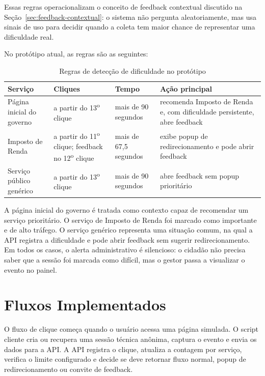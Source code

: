 Essas regras operacionalizam o conceito de feedback contextual discutido na
Seção~\ref{sec:feedback-contextual}: o sistema não pergunta aleatoriamente, mas
usa sinais de uso para decidir quando a coleta tem maior chance de representar
uma dificuldade real.

No protótipo atual, as regras são as seguintes:

\begin{table}[h]
\centering
\caption{Regras de detecção de dificuldade no protótipo}
\label{tab:regras-dificuldade}
\begin{tabular}{p{3.6cm} p{3.0cm} p{2.4cm} p{4.2cm}}
\hline
\textbf{Serviço} & \textbf{Cliques} & \textbf{Tempo} &
\textbf{Ação principal} \\
\hline
Página inicial do governo & a partir do 13\textsuperscript{o} clique &
mais de 90 segundos & recomenda Imposto de Renda e, com dificuldade persistente,
abre feedback \\
Imposto de Renda & a partir do 11\textsuperscript{o} clique; feedback no
12\textsuperscript{o} clique & mais de 67,5 segundos & exibe popup de
redirecionamento e pode abrir feedback \\
Serviço público genérico & a partir do 13\textsuperscript{o} clique &
mais de 90 segundos & abre feedback sem popup
prioritário \\
\hline
\end{tabular}
\end{table}

\clearpage

A página inicial do governo é tratada como contexto capaz de recomendar um
serviço prioritário. O serviço de Imposto de Renda foi marcado como importante e
de alto tráfego. O serviço genérico representa uma situação comum, na qual a API
registra a dificuldade e pode abrir feedback sem sugerir redirecionamento. Em
todos os casos, o alerta administrativo é silencioso: o cidadão não precisa saber
que a sessão foi marcada como difícil, mas o gestor passa a visualizar o evento
no painel.

\section{Fluxos Implementados}

O fluxo de clique começa quando o usuário acessa uma página simulada. O script
cliente cria ou recupera uma sessão técnica anônima, captura o evento e envia os
dados para a API. A API registra o clique, atualiza a contagem por serviço,
verifica o limite configurado e decide se deve retornar fluxo normal, popup de
redirecionamento ou convite de feedback.

